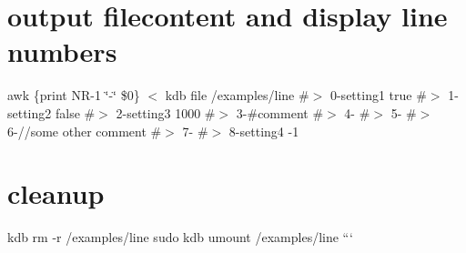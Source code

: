 \section*{output filecontent and display line numbers}

awk \textquotesingle{}\{print N\+R-\/1 \char`\"{}-\/\char`\"{} \$0\}\textquotesingle{} $<$ {\ttfamily kdb file /examples/line} \#$>$ 0-\/setting1 true \#$>$ 1-\/setting2 false \#$>$ 2-\/setting3 1000 \#$>$ 3-\/\#comment \#$>$ 4-\/ \#$>$ 5-\/ \#$>$ 6-\///some other comment \#$>$ 7-\/ \#$>$ 8-\/setting4 -\/1

\section*{cleanup}

kdb rm -\/r /examples/line sudo kdb umount /examples/line ``` 